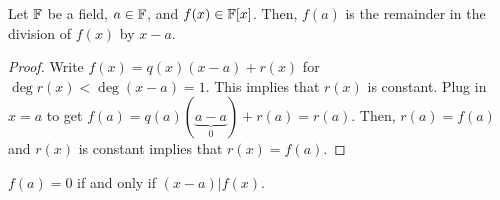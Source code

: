 \documentclass[letterpaper]{article}
\begin{document}
\begin{corollary}{}{}
    Let $\mathbb{F}$ be a field, $a \in \mathbb{F}$, and $f(x) \in \mathbb{F}[x]$. Then, $f(a)$ is the remainder in the division of $f(x)$ by $x - a$. 
\end{corollary}

\begin{mdframed}[]
    \begin{proof}
        Write $f(x) = q(x)(x - a) + r(x)$ for $\deg r(x) < \deg (x - a) = 1$. This implies that $r(x)$ is constant. Plug in $x = a$ to get $f(a) = q(a) (\underbrace{a - a}_{0}) + r(a) = r(a)$. Then, $r(a) = f(a)$ and $r(x)$ is constant implies that $r(x) = f(a)$. 
    \end{proof}
\end{mdframed}

\begin{corollary}{}{}
    $f(a) = 0$ if and only if $(x - a) | f(x)$. 
\end{corollary}
\end{document}
